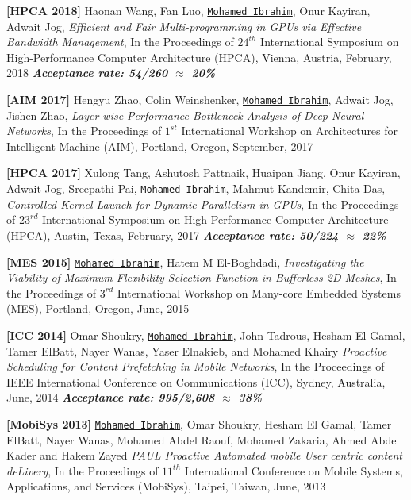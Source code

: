 \documentclass[10pt,a4]{article}
\begin{document}

\begin{description}
\item 
{\bf [HPCA 2018]}
Haonan Wang, Fan Luo, {\tt \underline{Mohamed Ibrahim}}, Onur Kayiran, Adwait Jog, 
{\it Efficient and Fair Multi-programming in GPUs via Effective Bandwidth Management},
In the Proceedings of $24^{th}$ International Symposium on High-Performance Computer Architecture (HPCA), 
Vienna, Austria, February, 2018
\textbf{\textit{Acceptance rate: 54/260 $\approx$ 20\%}}

\item 
{\bf [AIM 2017]}
Hengyu Zhao, Colin Weinshenker, {\tt \underline{Mohamed Ibrahim}}, Adwait Jog, Jishen Zhao,
{\it Layer-wise Performance Bottleneck Analysis of Deep Neural Networks},
In the Proceedings of $1^{st}$ International Workshop on Architectures for Intelligent Machine (AIM), Portland, Oregon, September, 2017

\item 
{\bf [HPCA 2017]}
Xulong Tang, Ashutosh Pattnaik, Huaipan Jiang, Onur Kayiran, Adwait Jog, Sreepathi Pai, {\tt \underline{Mohamed Ibrahim}}, Mahmut Kandemir, Chita Das, 
{\it Controlled Kernel Launch for Dynamic Parallelism in GPUs},
In the Proceedings of $23^{rd}$ International Symposium on High-Performance Computer Architecture (HPCA), 
Austin, Texas, February, 2017
\textbf{\textit{Acceptance rate: 50/224 $\approx$ 22\%}}


\item 
{\bf [MES 2015]}
{\tt \underline{Mohamed Ibrahim}}, Hatem M El-Boghdadi,
{\it Investigating the Viability of Maximum Flexibility Selection Function in Bufferless 2D Meshes},
In the Proceedings of $3^{rd}$ International Workshop on Many-core Embedded Systems (MES), Portland, Oregon, June, 2015

\item{\bf [ICC 2014]} 
Omar Shoukry, {\tt \underline{Mohamed Ibrahim}}, John Tadrous, Hesham El Gamal, Tamer ElBatt, Nayer Wanas, Yaser Elnakieb, and Mohamed Khairy 
{\it Proactive Scheduling for Content Pre­fetching in Mobile Networks}, 
In the Proceedings of IEEE International Conference on Communications (ICC), Sydney, Australia, June, 2014
\textbf{\textit{Acceptance rate: 995/2,608 $\approx$ 38\%}} 

\item{\bf [MobiSys 2013]} 
{\tt \underline{Mohamed Ibrahim}}, Omar Shoukry, Hesham El Gamal, Tamer ElBatt, Nayer Wanas, Mohamed Abdel Raouf, Mohamed Zakaria, Ahmed Abdel Kader and Hakem Zayed 
{\it PAUL­ Proactive Automated mobile User centric content deLivery}, 
In the Proceedings of $11^{th}$ International Conference on Mobile Systems, Applications, and Services (MobiSys), Taipei, Taiwan, June, 2013

\end{description}
\end{document}
